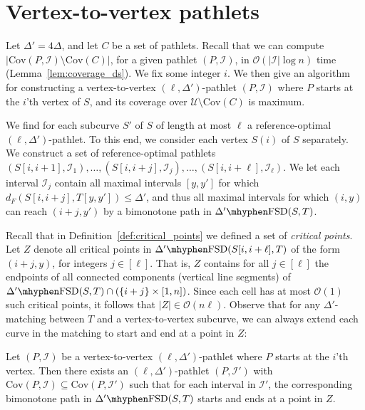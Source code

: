 \documentclass[a4paper,UKenglish,cleveref,thm-restate,notab]{lipics-v2021}
\newcommand{\dF}{\ensuremath{d_F}}
\newcommand{\FSD}[1][\Delta'] {\ensuremath{#1}\mhyphen\mathrm{FSD}}
\newcommand{\bigO}{\mathcal{O}}
\newcommand{\I}{\mathcal{I}}
\newcommand{\U}{\mathcal{U}}
\newcommand{\Cov}{\ensuremath{\mathrm{Cov}}}
\begin{document}
    \thmReachabilityGraph*

    
\section{Vertex-to-vertex pathlets}
\label{sec:vertex-to-vertex_pathlets}

    Let $\Delta' = 4\Delta$, and let $C$ be a set of pathlets.
    Recall that we can compute $|\Cov(P, \I) \setminus \Cov(C)|$, for a given pathlet $(P, \I)$, in $\bigO(|\I| \log n)$ time (Lemma~\ref{lem:coverage_ds}).
    We fix some integer $i$. We then give an algorithm for constructing a vertex-to-vertex $(\ell, \Delta')$-pathlet $(P, \I)$ where $P$ starts at the $i$'th vertex of $S$, and its coverage over $\U \setminus \Cov(C)$ is maximum.
    
    We find for each subcurve $S'$ of $S$ of length at most $\ell$ a reference-optimal $(\ell, \Delta')$-pathlet.
    To this end, we consider each vertex $S(i)$ of $S$ separately. 
    We construct a set of reference-optimal pathlets $(S[i, i+1], \I_1), \dots, (S[i, i+j], \I_j), \dots, (S[i, i+\ell], \I_\ell)$.
    We let each interval $\I_j$ contain all maximal intervals $[y, y']$ for which $\dF(S[i, i+j], T[y, y']) \leq \Delta'$, and thus all maximal intervals for which $(i, y)$ can reach $(i+j, y')$ by a bimonotone path in $\FSD(S, T)$.

    Recall that in Definition~\ref{def:critical_points} we defined a set of  \emph{critical points}. Let $Z$ denote all critical points in $\FSD(S[i, i+\ell], T)$ of the form $(i+j, y)$, for integers $j \in [\ell]$.
    That is, $Z$ contains for all  $j \in [\ell]$ the endpoints of all connected components (vertical line segments) of $\FSD(S, T) \cap (\{i+j\} \times [1, n])$.    
    Since each cell has at most $\bigO(1)$ such critical points, it follows that $|Z| \in \bigO(n \ell)$.
    Observe that for any $\Delta'$-matching between $T$ and a vertex-to-vertex subcurve, we can always extend each curve in the matching to start and end at a point in $Z$: 

    \begin{observation}
   Let $(P, \I)$ be a vertex-to-vertex  $(\ell, \Delta')$-pathlet where $P$ starts at the $i$'th vertex. 
        Then there exists an $(\ell, \Delta')$-pathlet $(P, \I')$ with $\Cov(P, \I) \subseteq \Cov(P, \I')$ such that for each interval in $\I'$, the corresponding bimonotone path in $\FSD(S, T)$ starts and ends at a point in $Z$. 
    \end{observation}
\end{document}
